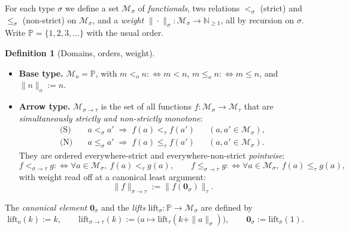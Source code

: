 \documentclass{amsart}
\theoremstyle{definition}
\newtheorem{definition}{Definition}
\begin{document}
For each type $\sigma$ we define a set $\mathcal M_\sigma$ of \emph{functionals}, two
relations $<_\sigma$ (strict) and $\le_\sigma$ (non-strict) on $\mathcal M_\sigma$, and
a \emph{weight} $\|\cdot\|_\sigma:\mathcal M_\sigma\to\mathbb N_{\ge 1}$, all by
recursion on $\sigma$. Write $\mathbb P=\{1,2,3,\dots\}$ with the usual order.

\begin{definition}[Domains, orders, weight]\label{def:dom}
\leavevmode
\begin{itemize}
\item \textbf{Base type.}
  $\mathcal M_o=\mathbb P$, with $m<_o n :\Leftrightarrow m<n$,
  $m\le_o n:\Leftrightarrow m\le n$, and $\|n\|_o:=n$.
\item \textbf{Arrow type.}
  $\mathcal M_{\sigma\to\tau}$ is the set of all functions
  $f:\mathcal M_\sigma\to\mathcal M_\tau$ that are \emph{simultaneously strictly and
  non-strictly monotone}:
  \begin{align*}
    \text{(S)}&\quad a<_\sigma a' \;\Longrightarrow\; f(a)<_\tau f(a')
       &&(a,a'\in\mathcal M_\sigma),\\
    \text{(N)}&\quad a\le_\sigma a' \;\Longrightarrow\; f(a)\le_\tau f(a')
       &&(a,a'\in\mathcal M_\sigma).
  \end{align*}
  They are ordered everywhere-strict and everywhere-non-strict \emph{pointwise}:
  \[
    f<_{\sigma\to\tau}g :\Leftrightarrow
    \forall a\in\mathcal M_\sigma,\ f(a)<_\tau g(a),
    \qquad
    f\le_{\sigma\to\tau}g :\Leftrightarrow
    \forall a\in\mathcal M_\sigma,\ f(a)\le_\tau g(a),
  \]
  with weight read off at a canonical least argument:
  \[
    \|f\|_{\sigma\to\tau}:=\|f(\mathbf 0_\sigma)\|_\tau .
  \]
\end{itemize}
The \emph{canonical element} $\mathbf 0_\sigma$ and the \emph{lifts}
$\mathrm{lift}_\sigma:\mathbb P\to\mathcal M_\sigma$ are defined by
\[
  \mathrm{lift}_o(k):=k,\qquad
  \mathrm{lift}_{\sigma\to\tau}(k):=\bigl(a\mapsto\mathrm{lift}_\tau(k+\|a\|_\sigma)\bigr),
  \qquad \mathbf 0_\sigma:=\mathrm{lift}_\sigma(1).
\]
\end{definition}
\end{document}
